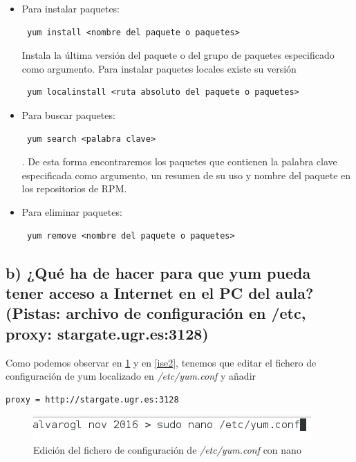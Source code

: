 \begin{itemize}
	\item{Para instalar paquetes: \begin{verbatim} yum install <nombre del paquete o paquetes> \end{verbatim}
	Instala la última versión del paquete o del grupo de paquetes especificado como argumento. Para instalar paquetes locales existe su versión \begin{verbatim} yum localinstall <ruta absoluto del paquete o paquetes> \end{verbatim}}
	\item{Para buscar paquetes: \begin{verbatim} yum search <palabra clave> \end{verbatim}.
	De esta forma encontraremos los paquetes que contienen la palabra clave especificada como argumento, un resumen de su uso y nombre del paquete en los repositorios de RPM.}
	\item{Para eliminar paquetes: \begin{verbatim} yum remove <nombre del paquete o paquetes> \end{verbatim}}
\end{itemize}

\subsection{b) ¿Qué ha de hacer para que yum pueda tener acceso a Internet en el PC del aula?(Pistas: archivo de configuración en /etc, proxy: stargate.ugr.es:3128)}

\cite{proxy-yum} Como podemos observar en \ref{ise1} y en \ref{ise2}, tenemos que editar el fichero de configuración de yum localizado en \textit{/etc/yum.conf} y añadir \begin{verbatim}
proxy = http://stargate.ugr.es:3128
\end{verbatim}

\begin{figure}[H]
	\centering
	\includegraphics[scale=0.8]{ise1.png}
	\caption{Edición del fichero de configuración de \textit{/etc/yum.conf} con nano} \label{ise1}
\end{figure}

